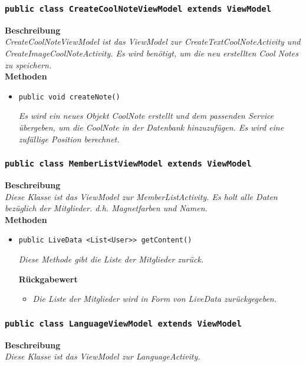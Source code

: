         \subsubsection{\texttt{public class CreateCoolNoteViewModel extends ViewModel}}
        \textbf{Beschreibung} \\
        \textit{CreateCoolNoteViewModel ist das ViewModel zur CreateTextCoolNoteActivity und CreateImageCoolNoteActivity. Es wird benötigt, um die neu erstellten Cool Notes zu speichern.}\\
        
		\textbf{Methoden}
 			\begin{itemize}
        		\item\texttt{{public void createNote()}}
        	
        		\textit{Es wird ein neues Objekt CoolNote erstellt und dem passenden Service übergeben, um die CoolNote in der Datenbank hinzuzufügen. Es wird eine zufällige Position berechnet.}
        	
       		\end{itemize}
       		 
        \subsubsection{\texttt{public class MemberListViewModel extends ViewModel}}
        \textbf{Beschreibung} \\
        \textit{Diese Klasse ist das ViewModel zur MemberListActivity. Es holt alle Daten bezüglich der Mitglieder. d.h. Magnetfarben und Namen.}\\
        
		\textbf{Methoden}
 			\begin{itemize}
        		\item\texttt{{public LiveData <List<User>{}> getContent()}}
        	
        		\textit{Diese Methode gibt die Liste der Mitglieder zurück.}
        		
        	\textbf{Rückgabewert}
        	\begin{itemize}
				\item\textit{Die Liste der Mitglieder wird in Form von LiveData zurückgegeben.}
       		\end{itemize}
       	
       		\end{itemize}
       		 
       
      	\subsubsection{\texttt{public class LanguageViewModel extends ViewModel}}
      	\textbf{Beschreibung} \\
        \textit{Diese Klasse ist das ViewModel zur LanguageActivity.}\\
        
